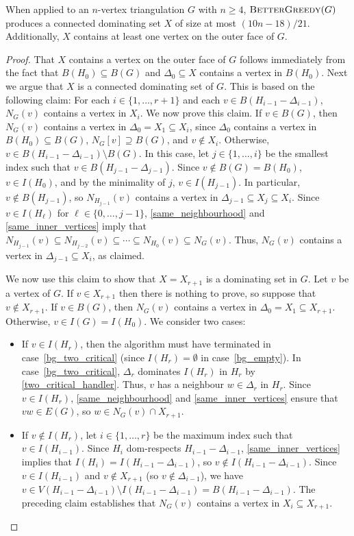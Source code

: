 \documentclass{patmorin}
\begin{document}
\begin{thm}\label{better_greedy}
  When applied to an $n$-vertex triangulation $G$ with $n\ge4$, $\textnormal{\textsc{BetterGreedy}}(G)$ produces a connected dominating set $X$ of size at most $(10n-18)/21$.  Additionally, $X$ contains at least one vertex on the outer face of $G$. 
\end{thm}
\begin{proof}
  That $X$ contains a vertex on the outer face of $G$ follows immediately from the fact that $B(H_0)\subseteq B(G)$ and $\Delta_0\subseteq X$ contains a vertex in $B(H_0)$.
  Next we argue that $X$ is a connected dominating set of $G$.  This is based on the following claim: For each $i\in\{1,\ldots,r+1\}$ and each $v\in B(H_{i-1}-\Delta_{i-1})$, $N_G(v)$ contains a vertex in $X_i$.  We now prove this claim.  If $v\in B(G)$, then $N_G(v)$ contains a vertex in $\Delta_0=X_1\subseteq X_i$, since $\Delta_0$ contains a vertex in $B(H_0)\subseteq B(G)$, $N_G[v]\supseteq B(G)$, and $v\not\in X_i$. Otherwise, $v\in B(H_{i-1}-\Delta_{i-1})\setminus B(G)$.  In this case, let $j\in\{1,\ldots,i\}$ be the smallest index such that $v\in B(H_{j-1}-\Delta_{j-1})$.  Since $v\not\in B(G)=B(H_0)$, $v\in I(H_0)$, and by the minimality of $j$, $v\in I(H_{j-1})$. In particular, $v\not\in B(H_{j-1})$, so $N_{H_{j-1}}(v)$ contains a vertex in $\Delta_{j-1} \subseteq X_j\subseteq X_i$.  Since $v\in I(H_\ell)$ for $\ell\in\{0,\ldots,j-1\}$, \ref{same_neighbourhood} and \ref{same_inner_vertices} imply that $N_{H_{j-1}}(v)\subseteq N_{H_{j-2}}(v)\subseteq\cdots\subseteq N_{H_{0}}(v)\subseteq N_{G}(v)$. Thus, $N_G(v)$ contains a vertex in $\Delta_{j-1}\subseteq X_i$, as claimed.

  We now use this claim to show that $X=X_{r+1}$ is a dominating set in $G$. Let $v$ be a vertex of $G$.  If $v\in X_{r+1}$ then there is nothing to prove, so suppose that $v\not\in X_{r+1}$.  
  If $v\in B(G)$, then $N_G(v)$ contains a vertex in $\Delta_0=X_1\subseteq X_{r+1}$. Otherwise, $v\in I(G)=I(H_0)$.  We consider two cases:
  \begin{itemize}
    \item If $v\in I(H_r)$, then the algorithm must have terminated in case~\ref{bg_two_critical} (since $I(H_r)=\emptyset$ in case~\ref{bg_empty}). In case~\ref{bg_two_critical}, $\Delta_r$ dominates $I(H_r)$ in $H_r$ by \cref{two_critical_handler}. Thus, $v$ has a neighbour $w\in\Delta_r$ in $H_r$. Since $v\in I(H_r)$, \ref{same_neighbourhood} and \ref{same_inner_vertices} ensure that $vw\in E(G)$, so $w\in N_G(v)\cap X_{r+1}$.
    \item If $v\not\in I(H_r)$, let $i\in\{1,\ldots,r\}$ be the maximum index such that $v\in I(H_{i-1})$. Since $H_i$ dom-respects $H_{i-1}-\Delta_{i-1}$, \ref{same_inner_vertices} implies that $I(H_i)=I(H_{i-1}-\Delta_{i-1})$, so $v\not\in I(H_{i-1}-\Delta_{i-1})$. Since $v\in I(H_{i-1})$ and $v\not\in X_{r+1}$ (so $v\not\in\Delta_{i-1}$), we have $v\in V(H_{i-1}-\Delta_{i-1})\setminus I(H_{i-1}-\Delta_{i-1}) = B(H_{i-1}-\Delta_{i-1})$. The preceding claim establishes that $N_G(v)$ contains a vertex in $X_i\subseteq X_{r+1}$.
  \end{itemize}
  

\end{proof}
\end{document}

